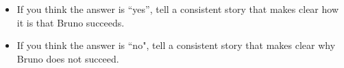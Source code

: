 \documentclass[12pt,letterpaper]{article}
\begin{document}
\begin{enumerate}
{{\begin{itemize}
\item If you think the answer is ``yes'', tell a consistent story that makes clear how it is that Bruno succeeds.

\item If you think the answer is ``no", tell a consistent story that makes clear why Bruno does not succeed.


\end{itemize}
}


}





\end{enumerate}
\end{document}

